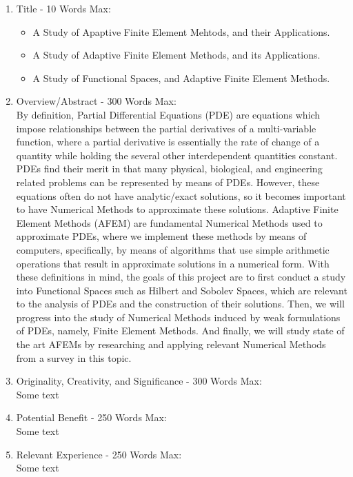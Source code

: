 \documentclass[11pt]{article}
\begin{document}
\pagestyle{fancy}
\fancyhead{}
\fancyhead[L]{\textbf{\rightmark}}

\begin{enumerate}

\item Title - 10 Words Max:
\begin{itemize}
\item A Study of Apaptive Finite Element Mehtods, and their Applications.
\item A Study of Adaptive Finite Element Methods, and its Applications.
\item A Study of Functional Spaces, and Adaptive Finite Element Methods.
\end{itemize}

\item Overview/Abstract - 300 Words Max: \\
By definition, Partial Differential Equations (PDE) are equations which impose relationships
between the partial derivatives of a multi-variable function, where a partial derivative is
essentially the rate of change of a quantity while holding the several other interdependent quantities constant.
PDEs find their merit in that many physical, biological, and engineering related problems can be represented by means of PDEs.
However, these equations often do not have analytic/exact solutions, so it becomes important to have Numerical Methods to approximate these solutions.
Adaptive Finite Element Methods (AFEM)
are fundamental Numerical Methods used to approximate PDEs, where we implement these methods by means of computers, specifically, by means
of algorithms that use simple arithmetic operations that result in approximate solutions in a numerical form.
With these definitions in mind, the goals of this project are to first conduct a study into Functional Spaces such as
Hilbert and Sobolev Spaces, which are relevant to the analysis of PDEs and the construction of their solutions.
Then, we will progress into the study of Numerical Methods induced by weak formulations
of PDEs, namely, Finite Element Methods. And finally, we will study state of the art AFEMs
by researching and applying relevant Numerical Methods from a survey in this topic.

\item Originality, Creativity, and Significance - 300 Words Max: \\
Some text

\item Potential Benefit - 250 Words Max: \\
Some text

\item Relevant Experience - 250 Words Max: \\
Some text

\end{enumerate}
\end{document}

